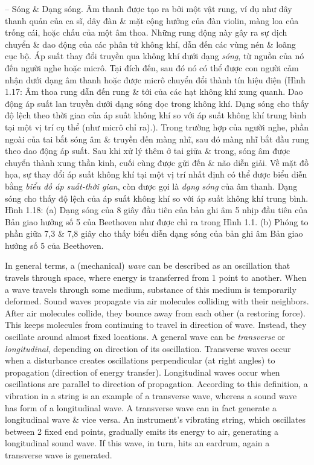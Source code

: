 \documentclass{article}
\begin{document}
\begin{itemize}
\begin{itemize}
\begin{itemize}
			-- {\sf Sóng \& Dạng sóng.} Âm thanh {\it} được tạo ra bởi một vật rung, ví dụ như dây thanh quản của ca sĩ, dây đàn \& mặt cộng hưởng của đàn violin, màng loa của trống cái, hoặc chấu của một âm thoa. Những rung động này gây ra sự dịch chuyển \& dao động của các phân tử không khí, dẫn đến các vùng nén \& loãng cục bộ. Áp suất thay đổi truyền qua không khí dưới dạng {\it sóng}, từ nguồn của nó đến người nghe hoặc micrô. Tại đích đến, sau đó nó có thể được con người cảm nhận dưới dạng âm thanh hoặc được micrô chuyển đổi thành tín hiệu điện ({\sf Hình 1.17: Âm thoa rung dẫn đến rung \& tới của các hạt không khí xung quanh. Dao động áp suất lan truyền dưới dạng sóng dọc trong không khí. Dạng sóng cho thấy độ lệch theo thời gian của áp suất không khí so với áp suất không khí trung bình tại một vị trí cụ thể (như micrô chỉ ra).}). Trong trường hợp của người nghe, phần ngoài của tai bắt sóng âm \& truyền đến màng nhĩ, sau đó màng nhĩ bắt đầu rung theo dao động áp suất. Sau khi xử lý thêm ở tai giữa \& trong, sóng âm được chuyển thành xung thần kinh, cuối cùng được gửi đến \& não diễn giải. Về mặt đồ họa, sự thay đổi áp suất không khí tại một vị trí nhất định có thể được biểu diễn bằng {\it biểu đồ áp suất-thời gian}, còn được gọi là {\it dạng sóng} của âm thanh. Dạng sóng cho thấy độ lệch của áp suất không khí so với áp suất không khí trung bình. {\sf Hình 1.18: (a) Dạng sóng của 8 giây đầu tiên của bản ghi âm 5 nhịp đầu tiên của Bản giao hưởng số 5 của Beethoven như được chỉ ra trong Hình 1.1. (b) Phóng to phần giữa 7,3 \& 7,8 giây} cho thấy biểu diễn dạng sóng của bản ghi âm Bản giao hưởng số 5 của Beethoven.
			
			In general terms, a (mechanical) {\it wave} can be described as an oscillation that travels through space, where energy is transferred from 1 point to another. When a wave travels through some medium, substance of this medium is temporarily deformed. Sound waves propagate via air molecules colliding with their neighbors. After air molecules collide, they bounce away from each other (a restoring force). This keeps molecules from continuing to travel in direction of wave. Instead, they oscillate around almost fixed locations. A general wave can be {\it transverse} or {\it longitudinal}, depending on direction of its oscillation. Transverse waves occur when a disturbance creates oscillations perpendicular (at right angles) to propagation (direction of energy transfer). Longitudinal waves occur when oscillations are parallel to direction of propagation. According to this definition, a vibration in a string is an example of a transverse wave, whereas a sound wave has form of a longitudinal wave. A transverse wave can in fact generate a longitudinal wave \& vice versa. An instrument's vibrating string, which oscillates between 2 fixed end points, gradually emits its energy to air, generating a longitudinal sound wave. If this wave, in turn, hits an eardrum, again a transverse wave is generated.
			

\end{itemize}
\end{itemize}
\end{itemize}
\end{document}
